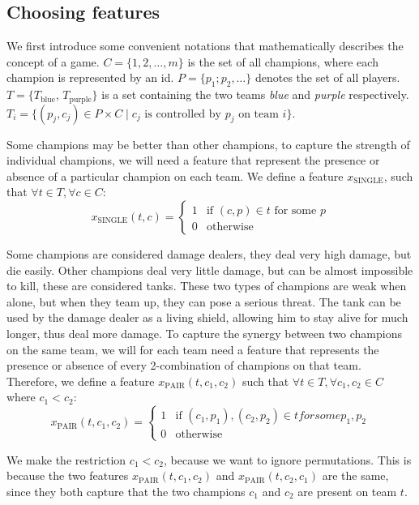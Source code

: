 \subsection{Choosing features}\label{sec:choosingfeatures}
We first introduce some convenient notations that mathematically describes the concept of a game.
$C = \{1, 2, \dots, m\}$ is the set of all champions, where each champion is represented by an id.
$P = \{p_1; p_2, \dots\}$ denotes the set of all players.
$T = \{T_\text{blue}$, $T_\text{purple}\}$ is a set containing the two teams \emph{blue} and \emph{purple} respectively.
$T_i = \{ (p_j, c_j) \in P \times C \mid c_j \text{ is controlled by } p_j \text{ on team } i \}$.

Some champions may be better than other champions, to capture the strength of individual champions, we will need a feature that represent the presence or absence of a particular champion on each team.
We define a feature $x_{\text{SINGLE}}$, such that $\forall t \in T, \forall c \in C:$
\[
x_{\text{SINGLE}}(t, c) = 
\begin{cases} 
  1 & \text{if } (c, p) \in t \text{ for some } p \\
  0 & \text{otherwise} 
\end{cases}
\]

Some champions are considered damage dealers, they deal very high damage, but die easily. Other champions deal very little damage, but can be almost impossible to kill, these are considered tanks. These two types of champions are weak when alone, but when they team up, they can pose a serious threat. The tank can be used by the damage dealer as a living shield, allowing him to stay alive for much longer, thus deal more damage.
To capture the synergy between two champions on the same team, we will for each team need a feature that represents the presence or absence of every 2-combination of champions on that team. Therefore, we define a feature $x_\text{PAIR}(t, c_1, c_2)$ such that $\forall t \in T, \forall c_1, c_2 \in C$ where $c_1 < c_2$:
\[
x_\text{PAIR}(t, c_1, c_2) = 
\begin{cases} 
  1 & \text{if } (c_1, p_1), (c_2, p_2) \in t for some p_1, p_2\\
  0 & \text{otherwise} 
\end{cases}
\]

We make the restriction $c_1 < c_2$, because we want to ignore permutations. This is because the two features $x_\text{PAIR}(t, c_1, c_2)$ and $x_\text{PAIR}(t, c_2, c_1)$ are the same, since they both capture that the two champions $c_1$ and $c_2$ are present on team $t$.

